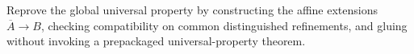 \begin{problem}\label{chal:vi28-03}
Reprove the global universal property by constructing the affine extensions $\overline A\to B$, checking compatibility on common distinguished refinements, and gluing without invoking a prepackaged universal-property theorem.
\end{problem}
